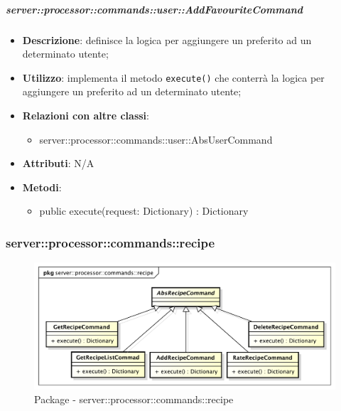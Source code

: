         \subparagraph{server::processor::commands::user::AddFavouriteCommand} %
        \label{subp:bdsm_app_server_processor_commands_user_addfavouritecommand}
        \begin{itemize}
          \item \textbf{Descrizione}: definisce la logica per aggiungere un preferito ad un determinato utente;
          \item \textbf{Utilizzo}: implementa il metodo \texttt{execute()} che conterrà la logica per aggiungere un preferito ad un determinato utente;
          \item \textbf{Relazioni con altre classi}:
            \begin{itemize}
              \item server::processor::commands::user::AbsUserCommand
            \end{itemize}
			\item \textbf{Attributi}: N/A
			\item \textbf{Metodi}:
        	\begin{itemize}
          		\item public execute(request: Dictionary) : Dictionary
        	\end{itemize}
        \end{itemize}


      \subsubsection{server::processor::commands::recipe} %
      \label{ssub:bdsm_app_server_processor_commands_recipe}
      \begin{figure}[!htbp]
      	\centering
      	\centerline{\includegraphics[scale=0.5]{./images/server/recipe.pdf}}
      	\caption{Package - server::processor::commands::recipe}
      \end{figure}

